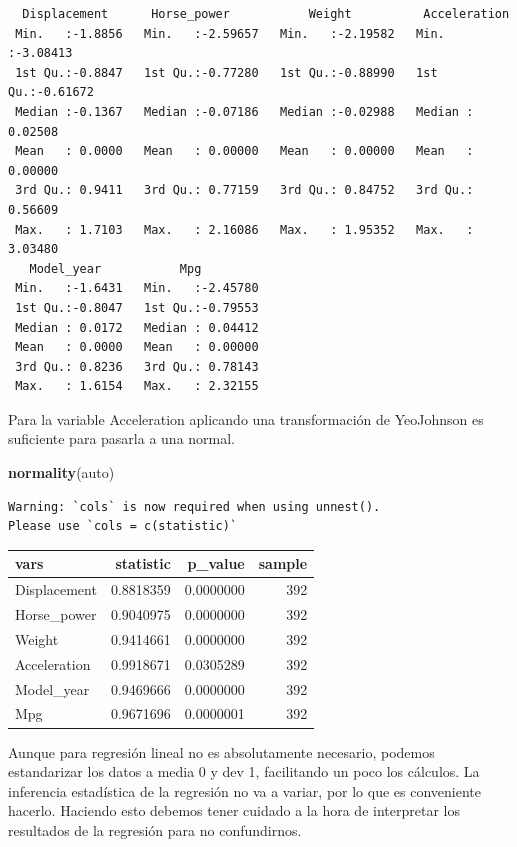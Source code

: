 \documentclass[
]{article}
\newenvironment{Shaded}{\begin{snugshade}}{\end{snugshade}}
\newcommand{\KeywordTok}[1]{\textcolor[rgb]{0.13,0.29,0.53}{\textbf{#1}}}
\newcommand{\NormalTok}[1]{#1}
\begin{document}
\begin{verbatim}
  Displacement      Horse_power           Weight          Acceleration     
 Min.   :-1.8856   Min.   :-2.59657   Min.   :-2.19582   Min.   :-3.08413  
 1st Qu.:-0.8847   1st Qu.:-0.77280   1st Qu.:-0.88990   1st Qu.:-0.61672  
 Median :-0.1367   Median :-0.07186   Median :-0.02988   Median : 0.02508  
 Mean   : 0.0000   Mean   : 0.00000   Mean   : 0.00000   Mean   : 0.00000  
 3rd Qu.: 0.9411   3rd Qu.: 0.77159   3rd Qu.: 0.84752   3rd Qu.: 0.56609  
 Max.   : 1.7103   Max.   : 2.16086   Max.   : 1.95352   Max.   : 3.03480  
   Model_year           Mpg          
 Min.   :-1.6431   Min.   :-2.45780  
 1st Qu.:-0.8047   1st Qu.:-0.79553  
 Median : 0.0172   Median : 0.04412  
 Mean   : 0.0000   Mean   : 0.00000  
 3rd Qu.: 0.8236   3rd Qu.: 0.78143  
 Max.   : 1.6154   Max.   : 2.32155  
\end{verbatim}

Para la variable Acceleration aplicando una transformación de YeoJohnson
es suficiente para pasarla a una normal.

\begin{Shaded}
\begin{Highlighting}[]
\KeywordTok{normality}\NormalTok{(auto)}
\end{Highlighting}
\end{Shaded}

\begin{verbatim}
Warning: `cols` is now required when using unnest().
Please use `cols = c(statistic)`
\end{verbatim}

\begin{tabular}{l|r|r|r}
\hline
vars & statistic & p\_value & sample\\
\hline
Displacement & 0.8818359 & 0.0000000 & 392\\
\hline
Horse\_power & 0.9040975 & 0.0000000 & 392\\
\hline
Weight & 0.9414661 & 0.0000000 & 392\\
\hline
Acceleration & 0.9918671 & 0.0305289 & 392\\
\hline
Model\_year & 0.9469666 & 0.0000000 & 392\\
\hline
Mpg & 0.9671696 & 0.0000001 & 392\\
\hline
\end{tabular}

Aunque para regresión lineal no es absolutamente necesario, podemos
estandarizar los datos a media 0 y dev 1, facilitando un poco los
cálculos. La inferencia estadística de la regresión no va a variar, por
lo que es conveniente hacerlo. Haciendo esto debemos tener cuidado a la
hora de interpretar los resultados de la regresión para no confundirnos.
\end{document}
